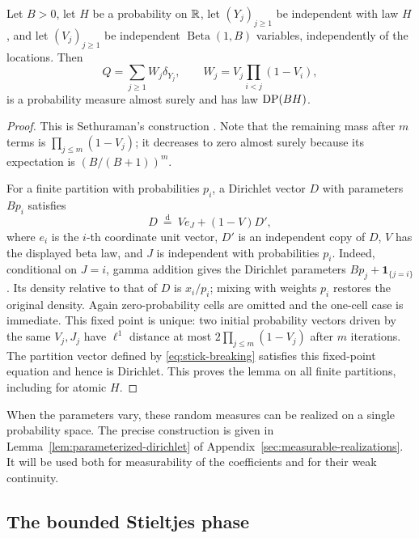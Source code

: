 \begin{lemma}\label{lem:stick-breaking}
Let \(B>0\), let \(H\) be a probability on \(\mathbb R\), let \((Y_j)_{j\ge1}\) be independent with law \(H\), and let \((V_j)_{j\ge1}\) be independent \(\operatorname{Beta}(1,B)\) variables, independently of the locations.
Then
\begin{equation}\label{eq:stick-breaking}
  Q=\sum_{j\ge1}W_j\delta_{Y_j},\qquad
  W_j=V_j\prod_{i<j}(1-V_i),
\end{equation}
is a probability measure almost surely and has law \(\operatorname{DP}(BH)\).
\end{lemma}

\begin{proof}
This is Sethuraman's construction \cite[Section~2, pp.~642--643, equation~(2.1), and Theorem~3.4, p.~645]{Sethuraman1994}.
Note that the remaining mass after \(m\) terms is \(\prod_{j\le m}(1-V_j)\); it decreases to zero almost surely because its expectation is \((B/(B+1))^m\).

For a finite partition with probabilities \(p_i\), a Dirichlet vector \(D\) with parameters \(Bp_i\) satisfies
\[
  D\ \overset{\mathrm d}=\ V e_J+(1-V)D',
\]
where \(e_i\) is the \(i\)-th coordinate unit vector, \(D'\) is an independent copy of \(D\), \(V\) has the displayed beta law, and \(J\) is independent with probabilities \(p_i\).
Indeed, conditional on \(J=i\), gamma addition gives the Dirichlet parameters \(Bp_j+\mathbf1_{\{j=i\}}\).
Its density relative to that of \(D\) is \(x_i/p_i\); mixing with weights \(p_i\) restores the original density.
Again zero-probability cells are omitted and the one-cell case is immediate.
This fixed point is unique: two initial probability vectors driven by the same \(V_j,J_j\) have \(\ell^1\) distance at most \(2\prod_{j\le m}(1-V_j)\) after \(m\) iterations.
The partition vector defined by \eqref{eq:stick-breaking} satisfies this fixed-point equation and hence is Dirichlet.
This proves the lemma on all finite partitions, including for atomic \(H\).
\end{proof}

When the parameters vary, these random measures can be realized on a single probability space.
The precise construction is given in Lemma~\ref{lem:parameterized-dirichlet} of Appendix~\ref{sec:measurable-realizations}.
It will be used both for measurability of the coefficients and for their weak continuity.

\subsection{The bounded Stieltjes phase}

